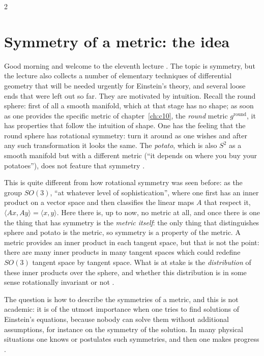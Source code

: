 \begin{paracol}{2}
\section{Symmetry of a metric: the idea}\label{sec:c11-idea}

Good morning and welcome to the eleventh lecture . The topic is symmetry, but the lecture also collects a number of elementary techniques of differential geometry that will be needed urgently for Einstein's theory, and several loose ends that were left out so far. They are motivated by intuition. Recall the round sphere: first of all a smooth manifold, which at that stage has no shape; as soon as one provides the specific metric of chapter~\ref{ch:c10}, the \emph{round} metric $g^{\mathrm{round}}$, it has properties that follow the intuition of shape. One has the feeling that the round sphere has rotational symmetry: turn it around as one wishes and after any such transformation it looks the same. The \emph{potato}, which is also $S^2$ as a smooth manifold but with a different metric (``it depends on where you buy your potatoes''), does not feature that symmetry .

This is quite different from how rotational symmetry was seen before: as the group $SO(3)$, ``at whatever level of sophistication'', where one first has an inner product on a vector space and then classifies the linear maps $A$ that respect it, $\langle Ax,Ay\rangle=\langle x,y\rangle$. Here there is, up to now, no metric at all, and once there is one the thing that has symmetry is the \emph{metric itself}: the only thing that distinguishes sphere and potato is the metric, so symmetry is a property of the metric. A metric provides an inner product in each tangent space, but that is not the point: there are many inner products in many tangent spaces which could redefine $SO(3)$ tangent space by tangent space. What is at stake is the \emph{distribution} of these inner products over the sphere, and whether this distribution is in some sense rotationally invariant or not .

The question is how to describe the symmetries of a metric, and this is not academic: it is of the utmost importance when one tries to find solutions of Einstein's equations, because nobody can solve them without additional assumptions, for instance on the symmetry of the solution. In many physical situations one knows or postulates such symmetries, and then one makes progress .


\end{paracol}
